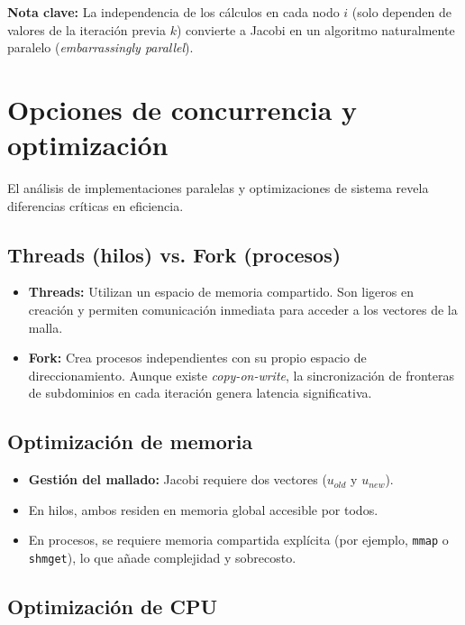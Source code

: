 \documentclass[11pt,a4paper]{article}
\begin{document}
\textbf{Nota clave:} La independencia de los cálculos en cada nodo $i$ (solo dependen de valores de la iteración previa $k$) convierte a Jacobi en un algoritmo naturalmente paralelo (\emph{embarrassingly parallel}).

\section{Opciones de concurrencia y optimización}

El análisis de implementaciones paralelas y optimizaciones de sistema revela diferencias críticas en eficiencia.

\subsection{Threads (hilos) vs. Fork (procesos)}

\begin{itemize}[leftmargin=1.2cm]
    \item \textbf{Threads:} Utilizan un espacio de memoria compartido. Son ligeros en creación y permiten comunicación inmediata para acceder a los vectores de la malla.
    \item \textbf{Fork:} Crea procesos independientes con su propio espacio de direccionamiento. Aunque existe \emph{copy-on-write}, la sincronización de fronteras de subdominios en cada iteración genera latencia significativa.
\end{itemize}

\subsection{Optimización de memoria}

\begin{itemize}[leftmargin=1.2cm]
    \item \textbf{Gestión del mallado:} Jacobi requiere dos vectores ($u_{old}$ y $u_{new}$).
    \item En hilos, ambos residen en memoria global accesible por todos.
    \item En procesos, se requiere memoria compartida explícita (por ejemplo, \texttt{mmap} o \texttt{shmget}), lo que añade complejidad y sobrecosto.
\end{itemize}

\subsection{Optimización de CPU}
\end{document}
